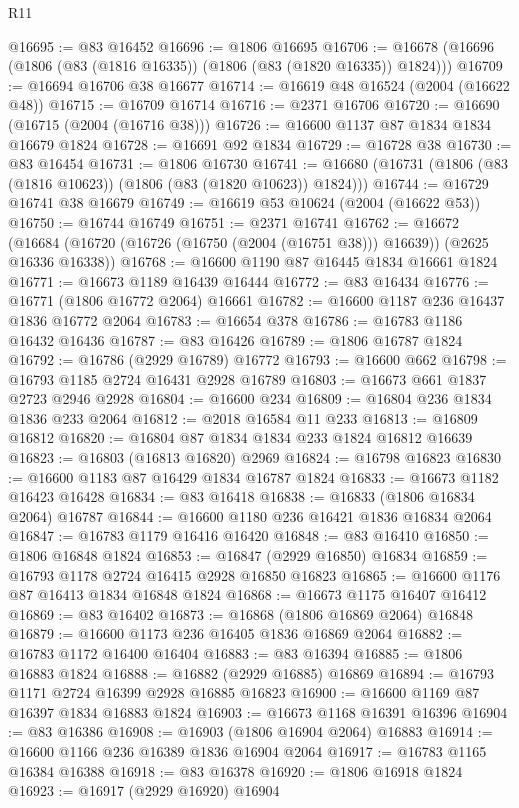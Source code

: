 \begin{lexlean}{R11}
\begin{coremodule}
@16695 := @83 @16452
@16696 := @1806 @16695
@16706 := @16678 (@16696 (@1806 (@83 (@1816 @16335)) (@1806 (@83 (@1820 @16335)) @1824)))
@16709 := @16694 @16706 @38 @16677
@16714 := @16619 @48 @16524 (@2004 (@16622 @48))
@16715 := @16709 @16714
@16716 := @2371 @16706
@16720 := @16690 (@16715 (@2004 (@16716 @38)))
@16726 := @16600 @1137 @87 @1834 @1834 @16679 @1824
@16728 := @16691 @92 @1834
@16729 := @16728 @38
@16730 := @83 @16454
@16731 := @1806 @16730
@16741 := @16680 (@16731 (@1806 (@83 (@1816 @10623)) (@1806 (@83 (@1820 @10623)) @1824)))
@16744 := @16729 @16741 @38 @16679
@16749 := @16619 @53 @10624 (@2004 (@16622 @53))
@16750 := @16744 @16749
@16751 := @2371 @16741
@16762 := @16672
    (@16684 (@16720 (@16726 (@16750 (@2004 (@16751 @38))) @16639)) (@2625 @16336 @16338))
@16768 := @16600 @1190 @87 @16445 @1834 @16661 @1824
@16771 := @16673 @1189 @16439 @16444
@16772 := @83 @16434
@16776 := @16771 (@1806 @16772 @2064) @16661
@16782 := @16600 @1187 @236 @16437 @1836 @16772 @2064
@16783 := @16654 @378
@16786 := @16783 @1186 @16432 @16436
@16787 := @83 @16426
@16789 := @1806 @16787 @1824
@16792 := @16786 (@2929 @16789) @16772
@16793 := @16600 @662
@16798 := @16793 @1185 @2724 @16431 @2928 @16789
@16803 := @16673 @661 @1837 @2723 @2946 @2928
@16804 := @16600 @234
@16809 := @16804 @236 @1834 @1836 @233 @2064
@16812 := @2018 @16584 @11 @233
@16813 := @16809 @16812
@16820 := @16804 @87 @1834 @1834 @233 @1824 @16812 @16639
@16823 := @16803 (@16813 @16820) @2969
@16824 := @16798 @16823
@16830 := @16600 @1183 @87 @16429 @1834 @16787 @1824
@16833 := @16673 @1182 @16423 @16428
@16834 := @83 @16418
@16838 := @16833 (@1806 @16834 @2064) @16787
@16844 := @16600 @1180 @236 @16421 @1836 @16834 @2064
@16847 := @16783 @1179 @16416 @16420
@16848 := @83 @16410
@16850 := @1806 @16848 @1824
@16853 := @16847 (@2929 @16850) @16834
@16859 := @16793 @1178 @2724 @16415 @2928 @16850 @16823
@16865 := @16600 @1176 @87 @16413 @1834 @16848 @1824
@16868 := @16673 @1175 @16407 @16412
@16869 := @83 @16402
@16873 := @16868 (@1806 @16869 @2064) @16848
@16879 := @16600 @1173 @236 @16405 @1836 @16869 @2064
@16882 := @16783 @1172 @16400 @16404
@16883 := @83 @16394
@16885 := @1806 @16883 @1824
@16888 := @16882 (@2929 @16885) @16869
@16894 := @16793 @1171 @2724 @16399 @2928 @16885 @16823
@16900 := @16600 @1169 @87 @16397 @1834 @16883 @1824
@16903 := @16673 @1168 @16391 @16396
@16904 := @83 @16386
@16908 := @16903 (@1806 @16904 @2064) @16883
@16914 := @16600 @1166 @236 @16389 @1836 @16904 @2064
@16917 := @16783 @1165 @16384 @16388
@16918 := @83 @16378
@16920 := @1806 @16918 @1824
@16923 := @16917 (@2929 @16920) @16904

\end{coremodule}
\end{lexlean}
